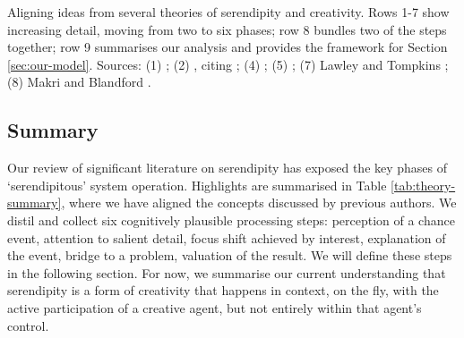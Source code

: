 \begin{table}
{\par}
\caption{Aligning ideas from several theories of serendipity and
  creativity.  Rows 1-7 show increasing detail, moving from two to six
  phases; row 8 bundles two of the steps together; row 9 summarises our
  analysis and
  provides the framework for Section \ref{sec:our-model}. Sources: (1) 
 \citet{andre2009discovery}; (2) \citet{mckay-serendipity}, citing \citet{bergson1946creative}; (4) \citet{Allen:2013:LOD:2655780.2655790}; (5) \citet{merton1948bearing}; (7) Lawley and Tompkins \cite{lawley2008maximising}; (8) Makri and
  Blandford \cite{Makri2012a}. \label{tab:theory-summary}}
\end{table}


\subsection{Summary} \label{sec:literature-summary}

Our review of significant literature on serendipity has exposed the
key phases of `serendipitous' system operation.  Highlights are
summarised in Table \ref{tab:theory-summary}, where we have aligned
the concepts discussed by previous authors.  We distil and collect six
cognitively plausible processing steps: perception of a chance event,
attention to salient detail, focus shift achieved by interest,
explanation of the event, bridge to a problem, valuation of the
result.  We will define these steps in the following section.  For
now, we summarise our current understanding that serendipity is a form
of creativity that happens in context, on the fly, with the active
participation of a creative agent, but not entirely within that
agent's control.

